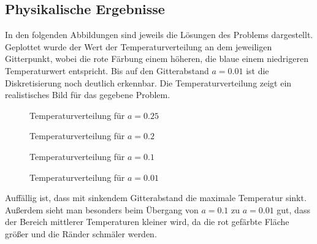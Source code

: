 \documentclass[10pt,a4paper]{article}
\begin{document}
\subsection{Physikalische Ergebnisse}
In den folgenden Abbildungen sind jeweils die Lösungen des Problems dargestellt. Geplottet wurde der Wert der Temperaturverteilung an dem jeweiligen Gitterpunkt, wobei die rote Färbung einem höheren, die blaue einem niedrigeren Temperaturwert entspricht. Bis auf den Gitterabstand $a=\num{0,01}$ ist die Diskretisierung noch deutlich erkennbar.
Die Temperaturverteilung zeigt ein realistisches Bild für das gegebene Problem.
\begin{figure}[htbp!]
\begin{minipage}[c]{0.5\linewidth}
\centering
\vspace{-40pt}
\scalebox{0.85}{}
\vspace{-40pt}
\caption{Temperaturverteilung für $a=\num{0,25}$}
\label{fig:a_25}
\end{minipage}
\begin{minipage}[c]{0.5\linewidth}
\centering
\vspace{-40pt}
\scalebox{0.85}{}
\vspace{-40pt}
\caption{Temperaturverteilung für $a=\num{0,2}$}
\label{fig:a_20}
\end{minipage}
\begin{minipage}[c]{0.5\linewidth}
\centering
\vspace{-40pt}
\scalebox{0.85}{}
\vspace{-40pt}
\caption{Temperaturverteilung für $a=\num{0,1}$}
\label{fig:a_10}
\end{minipage}
\begin{minipage}[c]{0.5\linewidth}
\centering
\vspace{-40pt}
\scalebox{0.85}{}
\vspace{-40pt}
\caption{Temperaturverteilung für $a=\num{0,01}$}
\label{fig:a_1}
\end{minipage}
\end{figure}
Auffällig ist, dass mit sinkendem Gitterabstand die maximale Temperatur sinkt. Außerdem sieht man besonders beim Übergang von $a=\num{0,1}$ zu $a=\num{0,01}$ gut, dass der Bereich mittlerer Temperaturen kleiner wird, da die rot gefärbte Fläche größer und die Ränder schmäler werden.
\end{document}
